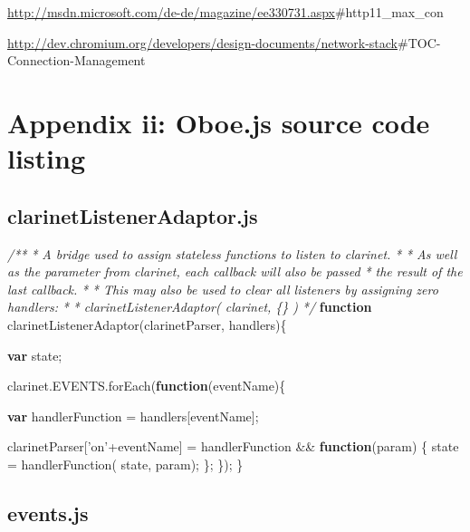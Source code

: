 \documentclass[]{article}
\let\stdsection\section
\renewcommand\section{\newpage\stdsection}
\newenvironment{Shaded}{}{}
\newcommand{\KeywordTok}[1]{\textcolor[rgb]{0.00,0.44,0.13}{\textbf{{#1}}}}
\newcommand{\StringTok}[1]{\textcolor[rgb]{0.25,0.44,0.63}{{#1}}}
\newcommand{\CommentTok}[1]{\textcolor[rgb]{0.38,0.63,0.69}{\textit{{#1}}}}
\newcommand{\OtherTok}[1]{\textcolor[rgb]{0.00,0.44,0.13}{{#1}}}
\newcommand{\FunctionTok}[1]{\textcolor[rgb]{0.02,0.16,0.49}{{#1}}}
\newcommand{\NormalTok}[1]{{#1}}
\begin{document}
\url{http://msdn.microsoft.com/de-de/magazine/ee330731.aspx}\#http11\_max\_con

\url{http://dev.chromium.org/developers/design-documents/network-stack}\#TOC-Connection-Management

\section{Appendix ii: Oboe.js source code listing}

\subsection{clarinetListenerAdaptor.js}

\begin{Shaded}
\begin{Highlighting}[]

\CommentTok{/** }
\CommentTok{ * A bridge used to assign stateless functions to listen to clarinet.}
\CommentTok{ * }
\CommentTok{ * As well as the parameter from clarinet, each callback will also be passed}
\CommentTok{ * the result of the last callback.}
\CommentTok{ * }
\CommentTok{ * This may also be used to clear all listeners by assigning zero handlers:}
\CommentTok{ * }
\CommentTok{ *    clarinetListenerAdaptor( clarinet, \{\} )}
\CommentTok{ */}
\KeywordTok{function} \FunctionTok{clarinetListenerAdaptor}\NormalTok{(clarinetParser, handlers)\{}
    
   \KeywordTok{var} \NormalTok{state;}

   \OtherTok{clarinet}\NormalTok{.}\OtherTok{EVENTS}\NormalTok{.}\FunctionTok{forEach}\NormalTok{(}\KeywordTok{function}\NormalTok{(eventName)\{}
 
      \KeywordTok{var} \NormalTok{handlerFunction = handlers[eventName];}
      
      \NormalTok{clarinetParser[}\StringTok{'on'}\NormalTok{+eventName] = handlerFunction && }
                                       \KeywordTok{function}\NormalTok{(param) \{}
                                          \NormalTok{state = }\FunctionTok{handlerFunction}\NormalTok{( state, param);}
                                       \NormalTok{\};}
   \NormalTok{\});}
\NormalTok{\}}
\end{Highlighting}
\end{Shaded}

\pagebreak

\subsection{events.js}
\end{document}
